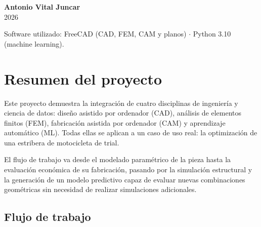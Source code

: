 \documentclass[11pt, a4paper]{article}
\begin{document}
\begin{titlepage}
\vfill

{\Large\bfseries Antonio Vital Juncar}\\[0.3em]
{\large\color{gris}2026}

\vspace{0.5em}

{\footnotesize\color{gris}
  Software utilizado: FreeCAD (CAD, FEM, CAM y planos) $\cdot$ Python 3.10 (machine learning).
}
\end{titlepage}

\tableofcontents
\newpage

\section{Resumen del proyecto}

Este proyecto demuestra la integración de cuatro disciplinas de ingeniería y ciencia
de datos: diseño asistido por ordenador (CAD), análisis de elementos finitos (FEM),
fabricación asistida por ordenador (CAM) y aprendizaje automático (ML). Todas ellas
se aplican a un caso de uso real: la optimización de una estribera de motocicleta de trial.

El flujo de trabajo va desde el modelado paramétrico de la pieza hasta la evaluación
económica de su fabricación, pasando por la simulación estructural y la generación de
un modelo predictivo capaz de evaluar nuevas combinaciones geométricas sin necesidad
de realizar simulaciones adicionales.

\subsection{Flujo de trabajo}
\end{document}
